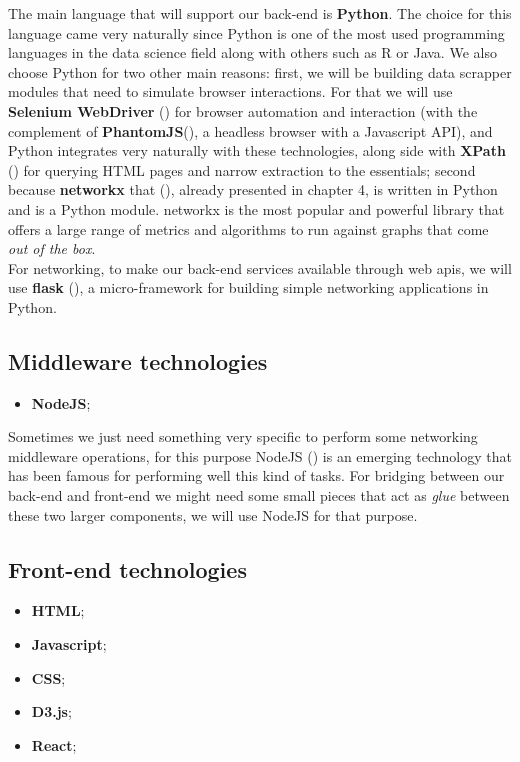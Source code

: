 The main language that will support our back-end is \textbf{Python}. The choice for this language came very naturally since Python is one of the most used programming languages in the data science field along with others such as R or Java. We also choose Python for two other main reasons: first, we will be building data scrapper modules that need to simulate browser interactions.
 For that we will use \textbf{Selenium WebDriver} (\cite{documentation2013selenium}) for browser automation and interaction (with the complement of \textbf{PhantomJS}(\cite{hidayat2013phantomjs}), a headless browser with a Javascript API), and Python integrates very naturally with these technologies, along side with \textbf{XPath} (\cite{clark1999xml}) for querying HTML pages and narrow extraction to the essentials; second because \textbf{networkx} that (\cite{hagberg2013networkx}), already presented in chapter 4, is written in Python and is a Python module. networkx is the most popular and powerful library that offers a large range of metrics and algorithms to run against graphs that come \textit{out of the box}.\\
\indent For networking, to make our back-end services available through web \glspl{api}, we will use \textbf{flask} (\cite{ronacher2015flask}), a micro-framework for building simple networking applications in Python.

\subsection{Middleware technologies}
\begin{itemize}
    \item \textbf{NodeJS};
\end{itemize}

Sometimes we just need something very specific to perform some networking middleware operations, for this purpose NodeJS (\cite{nodejs}) is an emerging technology
that has been famous for performing well this kind of tasks. For bridging between our back-end and front-end we might need some small pieces that act
as \textit{glue} between these two larger components, we will use NodeJS for that purpose.

\subsection{Front-end technologies}
\begin{itemize}
    \item \textbf{HTML};
    \item \textbf{Javascript};
    \item \textbf{CSS};
    \item \textbf{D3.js};
    \item \textbf{React};
\end{itemize}

